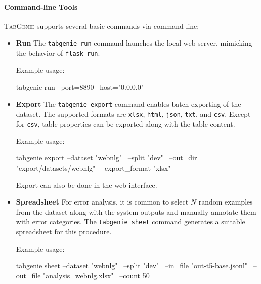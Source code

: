 \paragraph{Command-line Tools} \textsc{TabGenie} supports several basic commands via command line:
\begin{itemize}
    \item \textbf{Run} The \texttt{tabgenie run} command launches the local web server, mimicking the behavior of \texttt{flask run}.

          \noindent Example usage:
\begin{bash}
tabgenie run --port=8890 --host="0.0.0.0"
\end{bash}
    \item \textbf{Export} The \texttt{tabgenie export} command enables batch exporting of the dataset. The supported formats are \texttt{xlsx}, \texttt{html}, \texttt{json}, \texttt{txt}, and \texttt{csv}. Except for \texttt{csv}, table properties can be exported along with the table content.

          \noindent Example usage:
\begin{bash}
tabgenie export --dataset "webnlg" \
    --split "dev" \
    --out_dir "export/datasets/webnlg" \
    --export_format "xlsx"
\end{bash}
          \noindent Export can also be done in the web interface.
    \item \textbf{Spreadsheet} For error analysis, it is common to select $N$ random examples from the dataset along with the system outputs and manually annotate them with error categories. The \texttt{tabgenie sheet} command generates a suitable spreadsheet for this procedure.

          \noindent Example usage:
\begin{bash}
tabgenie sheet --dataset "webnlg" \
    --split "dev" \
    --in_file "out-t5-base.jsonl" \
    --out_file "analysis_webnlg.xlsx" \
    --count 50
    \end{bash}
\end{itemize}